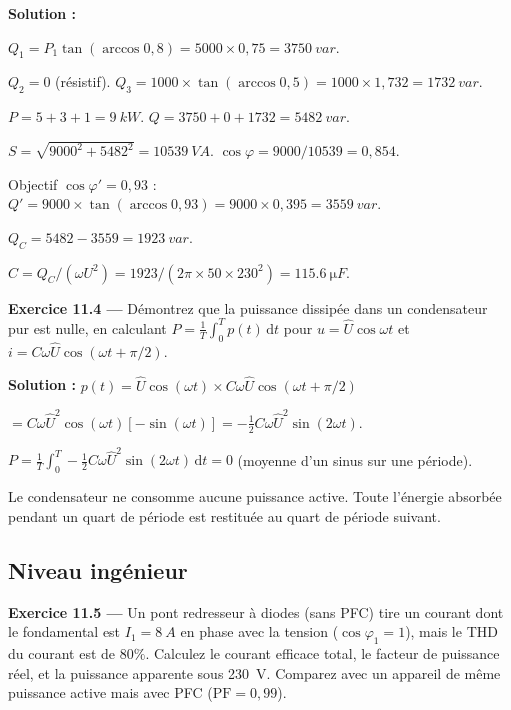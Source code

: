 \documentclass[12pt,a4paper,twoside]{book}
\begin{document}
\begin{pratique}
\textbf{Solution :}

$Q_1 = P_1\tan(\arccos 0{,}8) = 5000\times0{,}75 = \SI{3750}{var}$.

$Q_2 = 0$ (résistif). $Q_3 = 1000\times\tan(\arccos 0{,}5) = 1000\times1{,}732 = \SI{1732}{var}$.

$P = 5+3+1 = \SI{9}{kW}$. $Q = 3750+0+1732 = \SI{5482}{var}$.

$S = \sqrt{9000^2+5482^2} = \SI{10539}{VA}$. $\cos\varphi = 9000/10539 = 0{,}854$.

Objectif $\cos\varphi' = 0{,}93$ : $Q' = 9000\times\tan(\arccos 0{,}93) = 9000\times0{,}395 = \SI{3559}{var}$.

$Q_C = 5482 - 3559 = \SI{1923}{var}$.

$C = Q_C/(\omega U^2) = 1923/(2\pi\times50\times230^2) = \SI{115.6}{\micro F}$.
\end{pratique}

\textbf{Exercice 11.4 ---} Démontrez que la puissance dissipée dans un condensateur pur est nulle, en calculant $P = \frac{1}{T}\int_0^T p(t)\,\mathrm{d}t$ pour $u = \hat{U}\cos\omega t$ et $i = C\omega\hat{U}\cos(\omega t + \pi/2)$.

\begin{pratique}
\textbf{Solution :} $p(t) = \hat{U}\cos(\omega t) \times C\omega\hat{U}\cos(\omega t + \pi/2)$

$= C\omega\hat{U}^2\cos(\omega t)[-\sin(\omega t)] = -\frac{1}{2}C\omega\hat{U}^2\sin(2\omega t)$.

$P = \frac{1}{T}\int_0^T -\frac{1}{2}C\omega\hat{U}^2\sin(2\omega t)\,\mathrm{d}t = 0$ \checkmark{} (moyenne d'un sinus sur une période).

Le condensateur ne consomme aucune puissance active. Toute l'énergie absorbée pendant un quart de période est restituée au quart de période suivant.
\end{pratique}

\subsection*{Niveau ingénieur}

\textbf{Exercice 11.5 ---} Un pont redresseur à diodes (sans PFC) tire un courant dont le fondamental est $I_1 = \SI{8}{A}$ en phase avec la tension ($\cos\varphi_1 = 1$), mais le THD du courant est de $80\%$. Calculez le courant efficace total, le facteur de puissance réel, et la puissance apparente sous \SI{230}{V}. Comparez avec un appareil de même puissance active mais avec PFC ($\text{PF} = 0{,}99$).
\end{document}
